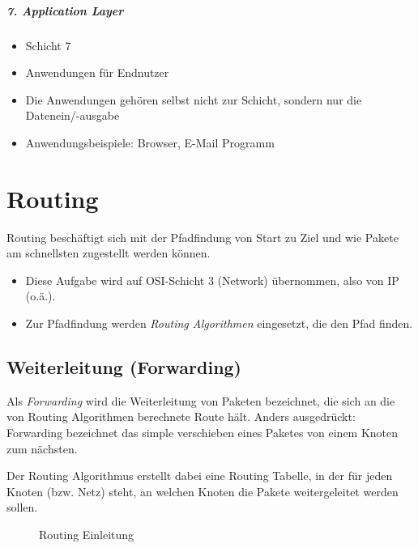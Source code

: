     \paragraph{7. Application Layer}
        \begin{itemize}
        	\item Schicht 7
        	\item Anwendungen für Endnutzer
        	\item Die Anwendungen gehören selbst nicht zur Schicht, sondern nur die Datenein/-ausgabe
        	\item Anwendungsbeispiele: Browser, E-Mail Programm
        \end{itemize}

\chapter{Routing}
    Routing beschäftigt sich mit der Pfadfindung von Start zu Ziel und wie Pakete am schnellsten zugestellt werden können.
    \begin{itemize}
    	\item Diese Aufgabe wird auf OSI-Schicht 3 (Network) übernommen, also von IP (o.ä.).
    	\item Zur Pfadfindung werden \textit{Routing Algorithmen} eingesetzt, die den Pfad finden.
    \end{itemize}

    \section{Weiterleitung (Forwarding)}
        Als \textit{Forwarding} wird die Weiterleitung von Paketen bezeichnet, die sich an die von Routing Algorithmen berechnete Route hält. Anders ausgedrückt: Forwarding bezeichnet das simple verschieben eines Paketes von einem Knoten zum nächsten.
        
        Der Routing Algorithmus erstellt dabei eine Routing Tabelle, in der für jeden Knoten (bzw. Netz) steht, an welchen Knoten die Pakete weitergeleitet werden sollen.
        
        \begin{figure}[H]
		    \centering
            \caption{Routing Einleitung}
        \end{figure}


